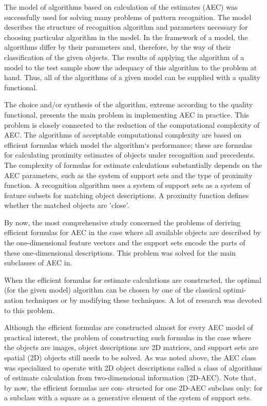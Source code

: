 The model of algorithms based on calculation of the estimates 
(AEC) was successfully used for solving many problems of pattern 
recognition. The model describes the structure of recognition 
algorithm and parameters necessary for choosing particular 
algorithm in the model. In the framework of a model, the algorithms 
differ by their parameters and, therefore, by the way of their 
classification of the given objects. The results of applying the 
algorithm of a model to the test sample show the adequacy of this 
algorithm to the problem at hand. Thus, all of the algorithms 
of a given model can be supplied with a quality functional. 

The choice and/or synthesis of the algorithm, extreme according 
to the quality functional, presents the main problem in implementing 
AEC in practice. This problem is closely connected to the reduction 
of the computational complexity of AEC. The algorithms of acceptable 
computational complexity are based on efficient formulas which model 
the algorithm`s performance; these are formulas for calculating 
proximity estimates of objects under recognition and precedents. 
The complexity of formulas for estimate calculations substantially 
depends on the AEC parameters, such as the system of support 
sets and the type of proximity function. A recognition algorithm 
uses a system of support sets as a system of feature subsets 
for matching object descriptions. A proximity function defines 
whether the matched objects are 'close'. 

By now, the most comprehensive study concerned the problems 
of deriving efficient formulas for AEC in the case where all 
available objects are described by the one-dimensional feature 
vectors and the support sets encode the parts of these one-dimensional 
descriptions. This problem was solved for the main subclasses of AEC in.

When the efficient formulas for estimate calculations are constructed, 
the optimal (for the given model) algorithm can be chosen by 
one of the classical optimi- zation techniques or by modifying 
these techniques. A lot of research was devoted to this problem.
  
Although the efficient formulas are constructed almost for every 
AEC model of practical interest, the problem of constructing such 
formulas in the case where the objects are images, object 
descriptions are 2D matrices, and support sets are spatial (2D) 
objects still needs to be solved. As was noted above, the AEC 
class was specialized to operate with 2D object descriptions 
called a class of algorithms of estimate calculation from 
two-dimensional information (2D-AEC). Note that, by now, 
the efficient formulas are con- structed for one 2D-AEC subclass 
only: for a subclass with a square as a generative element of the 
system of support sets.

